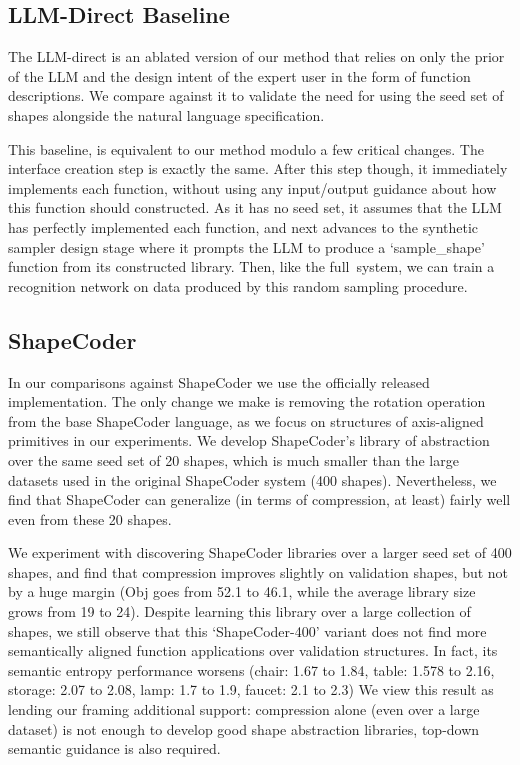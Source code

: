 \subsection{LLM-Direct Baseline}

The LLM-direct is an ablated version of our method that relies on only the prior of the LLM and the design intent of the expert user in the form of function descriptions.
We compare against it to validate the need for using the seed set of shapes alongside the natural language specification. 

This baseline, is equivalent to our method modulo a few critical changes. The interface creation step is exactly the same. 
After this step though, it immediately implements each function, without using any input/output guidance about how this function should constructed. 
As it has no seed set, it assumes that the LLM has perfectly implemented each function, and next advances to the synthetic sampler design stage where it prompts the LLM to produce a `sample\_shape' function from its constructed library.
Then, like the full~\methodname system, we can train a recognition network on data produced by this random sampling procedure.


\subsection{ShapeCoder}

In our comparisons against ShapeCoder we use the officially released implementation. 
The only change we make is removing the rotation operation from the base ShapeCoder language,
as we focus on structures of axis-aligned primitives in our experiments.
We develop ShapeCoder's library of abstraction over the same seed set of 20 shapes, which is much smaller than the large datasets used in the original ShapeCoder system (400 shapes).
Nevertheless, we find that ShapeCoder can generalize (in terms of compression, at least) fairly well even from these 20 shapes.

We experiment with discovering ShapeCoder libraries over a larger seed set of 400 shapes, and find that compression improves slightly on validation shapes, but not by a huge margin (Obj goes from 52.1 to 46.1, while the average library size grows from 19 to 24). 
Despite learning this library over a large collection of shapes, we still observe that this `ShapeCoder-400' variant does not find more semantically aligned function applications over validation structures.
In fact, its semantic entropy performance worsens (chair: 1.67 to 1.84, table: 1.578 to 2.16, storage: 2.07 to 2.08, lamp: 1.7 to 1.9, faucet: 2.1 to 2.3)
We view this result as lending our framing additional support: 
compression alone (even over a large dataset) is not enough to develop good shape abstraction libraries, top-down semantic guidance is also required.